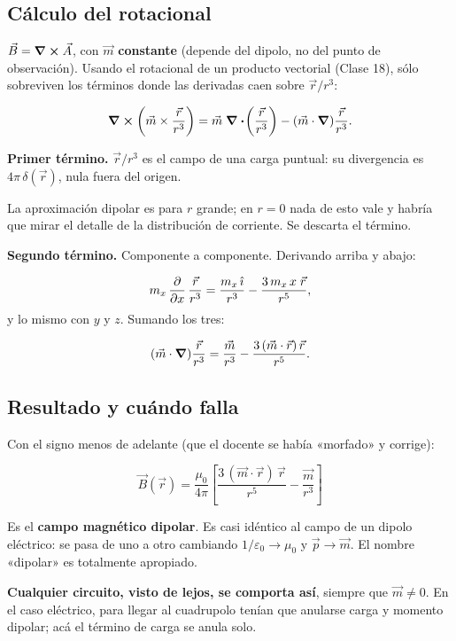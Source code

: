 \documentclass[12pt,a4paper]{article}
\begin{document}
\subsection{Cálculo del rotacional}

$\vec B = \curl \vec A$, con $\vec m$ \textbf{constante} (depende del dipolo,
no del punto de observación). Usando el rotacional de un producto vectorial
(Clase 18), sólo sobreviven los términos donde las derivadas caen sobre
$\vec r/r^3$:

\[
\curl \left(\vec m\times\frac{\vec r}{r^3}\right)
= \vec m\;\div \!\left(\frac{\vec r}{r^3}\right)
- (\vec m\cdot\vnabla)\frac{\vec r}{r^3}.
\]

\textbf{Primer término.} $\vec r/r^3$ es el campo de una carga puntual: su
divergencia es $4\pi\,\delta(\vec r)$, nula fuera del origen.

\begin{warnbox}
La aproximación dipolar es para $r$
grande; en $r=0$ nada de esto vale y habría que mirar el detalle de la
distribución de corriente. Se descarta el término.
\end{warnbox}

\textbf{Segundo término.} Componente a componente. Derivando arriba y abajo:

\[
m_x\,\pdv{x}\,\frac{\vec r}{r^3}
= \frac{m_x\,\hat\imath}{r^3} - \frac{3\,m_x\,x\;\vec r}{r^5},
\]
y lo mismo con $y$ y $z$. Sumando los tres:

\[
(\vec m\cdot\vnabla)\frac{\vec r}{r^3}
= \frac{\vec m}{r^3} - \frac{3\,(\vec m\cdot\vec r)\,\vec r}{r^5}.
\]

\subsection{Resultado y cuándo falla}

Con el signo menos de adelante (que el docente se había «morfado» y corrige):

\begin{keybox}
\[
\boxed{\ \vec B(\vec r) = \frac{\mu_0}{4\pi}\left[
\frac{3\,(\vec m\cdot\vec r)\,\vec r}{r^5} - \frac{\vec m}{r^3}\right]\ }
\]
\end{keybox}

Es el \textbf{campo magnético dipolar}. Es casi idéntico al campo de un dipolo
eléctrico: se pasa de uno a otro cambiando $1/\varepsilon_0\to\mu_0$ y
$\vec p\to\vec m$. El nombre «dipolar» es totalmente apropiado.

\begin{notebox}
\textbf{Cualquier circuito, visto de lejos, se comporta así}, siempre que
$\vec m\neq0$. En el caso eléctrico, para llegar al cuadrupolo tenían que
anularse carga y momento dipolar; acá el término de carga se anula solo.
\end{notebox}
\end{document}
